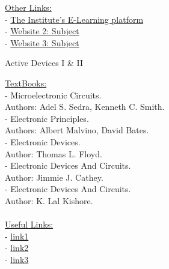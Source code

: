 \documentclass{article}
\begin{document}
\noindent \underline{Other Links:}\\ [.15cm]
 - \href{https://elearning.univ-boumerdes.dz/}{The Institute's E-Learning platform}\\
 - \href{URL}{Website 2: Subject}\\
 - \href{URL}{Website 3: Subject}\\



\newpage
\begin{center}
    \huge Active Devices I \& II
\end{center}
\underline{\Large TextBooks:}\\ [0.15cm]
- Microelectronic Circuits.\\
\indent Authors: Adel S. Sedra, Kenneth C. Smith.\\
- Electronic Principles.\\
\indent Authors: Albert Malvino, David Bates. \\
- Electronic Devices.\\
\indent Author: Thomas L. Floyd. \\
- Electronic Devices And Circuits.\\
\indent Author: Jimmie J. Cathey.\\ 
- Electronic Devices And Circuits.\\
\indent Author: K. Lal Kishore.\\ \\

\noindent\underline{\Large Useful Links:}\\
- \href{URL}{link1}\\
- \href{URL}{link2}\\
- \href{URL}{link3}\\\\
\end{document}
